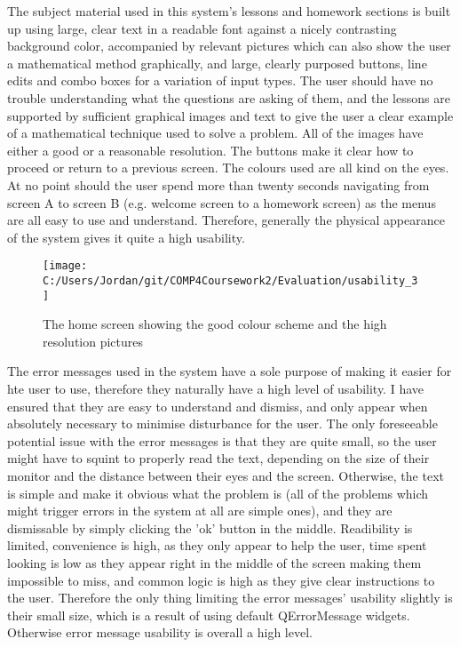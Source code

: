 The subject material used in this system's lessons and homework sections is built up using large, clear text in a readable font against a nicely contrasting background color, accompanied by relevant pictures which can also show the user a mathematical method graphically, and large, clearly purposed buttons, line edits and combo boxes for a variation of input types. The user should have no trouble understanding what the questions are asking of them, and the lessons are supported by sufficient graphical images and text to give the user a clear example of a mathematical technique used to solve a problem. All of the images have either a good or a reasonable resolution. The buttons make it clear how to proceed or return to a previous screen. The colours used are all kind on the eyes. At no point should the user spend more than twenty seconds navigating from screen A to screen B (e.g. welcome screen to a homework screen) as the menus are all easy to use and understand. Therefore, generally the physical appearance of the system gives it quite a high usability.

\begin{figure}[H]
	\texttt{[image: C:/Users/Jordan/git/COMP4Coursework2/Evaluation/usability\_3]}
	\caption{The home screen showing the good colour scheme and the high resolution pictures}
\end{figure}

The error messages used in the system have a sole purpose of making it easier for hte user to use, therefore they naturally have a high level of usability. I have ensured that they are easy to understand and dismiss, and only appear when absolutely necessary to minimise disturbance for the user. The only foreseeable potential issue with the error messages is that they are quite small, so the user might have to squint to properly read the text, depending on the size of their monitor and the distance between their eyes and the screen. Otherwise, the text is simple and make it obvious what the problem is (all of the problems which might trigger errors in the system at all are simple ones), and they are dismissable by simply clicking the 'ok' button in the middle. Readibility is limited, convenience is high, as they only appear to help the user, time spent looking is low as they appear right in the middle of the screen making them impossible to miss, and common logic is high as they give clear instructions to the user. Therefore the only thing limiting the error messages' usability slightly is their small size, which is a result of using default QErrorMessage widgets. Otherwise error message usability is overall a high level.

